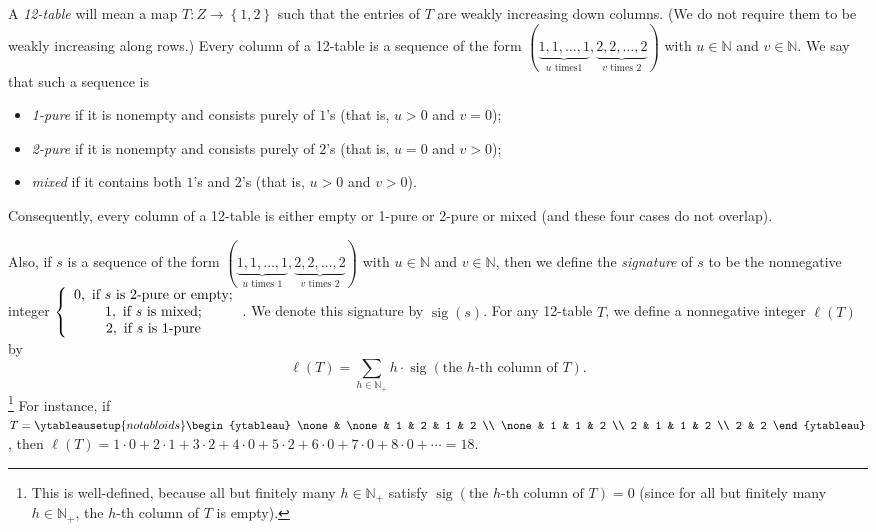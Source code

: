 \documentclass[numbers=enddot,12pt,final,onecolumn,notitlepage]{scrartcl}%
\theoremstyle{definition}
\let\sumnonlimits\sum
\renewcommand{\sum}{\sumnonlimits\limits}
\begin{document}
A \textit{12-table} will mean a map $T:Z\rightarrow\left\{  1,2\right\}  $
such that the entries of $T$ are weakly increasing down columns. (We do not
require them to be weakly increasing along rows.) Every column of a 12-table
is a sequence of the form $\left(  \underbrace{1,1,\ldots,1}_{u\text{ times
}1},\underbrace{2,2,\ldots,2}_{v\text{ times }2}\right)  $ with $u\in
\mathbb{N}$ and $v\in\mathbb{N}$. We say that such a sequence is

\begin{itemize}
\item \textit{1-pure} if it is nonempty and consists purely of $1$'s (that is,
$u>0$ and $v=0$);

\item \textit{2-pure} if it is nonempty and consists purely of $2$'s (that is,
$u=0$ and $v>0$);

\item \textit{mixed} if it contains both $1$'s and $2$'s (that is, $u>0$ and
$v>0$).
\end{itemize}

Consequently, every column of a 12-table is either empty or 1-pure or 2-pure
or mixed (and these four cases do not overlap).

Also, if $s$ is a sequence of the form $\left(  \underbrace{1,1,\ldots
,1}_{u\text{ times }1},\underbrace{2,2,\ldots,2}_{v\text{ times }2}\right)  $
with $u\in\mathbb{N}$ and $v\in\mathbb{N}$, then we define the
\textit{signature} of $s$ to be the nonnegative integer $\left\{
\begin{array}
[c]{c}%
0,\text{ if }s\text{ is 2-pure or empty;}\\
1,\text{ if }s\text{ is mixed;}\\
2,\text{ if }s\text{ is 1-pure}%
\end{array}
\right.  $. We denote this signature by $\operatorname*{sig}\left(  s\right)
$. For any 12-table $T$, we define a nonnegative integer $\ell\left(
T\right)  $ by%
\[
\ell\left(  T\right)  =\sum_{h\in\mathbb{N}_{+}}h\cdot\operatorname*{sig}%
\left(  \text{the }h\text{-th column of }T\right)  .
\]
\footnote{This is well-defined, because all but finitely many $h\in
\mathbb{N}_{+}$ satisfy $\operatorname*{sig}\left(  \text{the }h\text{-th
column of }T\right)  =0$ (since for all but finitely many $h\in\mathbb{N}_{+}%
$, the $h$-th column of $T$ is empty).} For instance, if $T=%
\ytableausetup{notabloids}
\begin{ytableau}
\none& \none& 1 & 2 & 1 & 2 \\
\none& 1 & 1 & 2 \\
2 & 1 & 1 & 2 \\
2 & 2
\end{ytableau}%
$, then $\ell\left(  T\right)  =1\cdot0+2\cdot1+3\cdot2+4\cdot0+5\cdot
2+6\cdot0+7\cdot0+8\cdot0+\cdots=18$.
\end{document}
